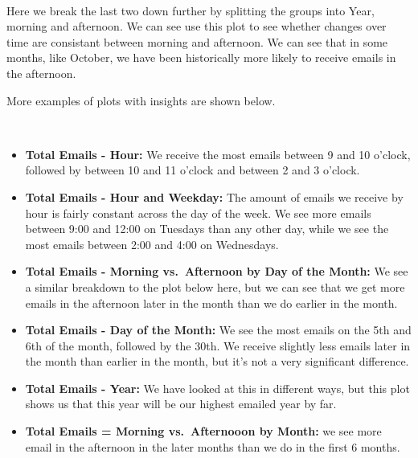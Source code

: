 \documentclass[11pt]{article}
\providecommand{\tightlist}{%
      \setlength{\itemsep}{0pt}\setlength{\parskip}{0pt}}
\begin{document}
    \begin{center}
    \end{center}
    { \hspace*{\fill} \\}
    
    Here we break the last two down further by splitting the groups into
Year, morning and afternoon. We can see use this plot to see whether
changes over time are consistant between morning and afternoon. We can
see that in some months, like October, we have been historically more
likely to receive emails in the afternoon.

    More examples of plots with insights are shown below.

    \begin{center}
    \end{center}
    { \hspace*{\fill} \\}
    
    \begin{itemize}
\tightlist
\item
  \textbf{Total Emails - Hour:} We receive the most emails between 9 and
  10 o'clock, followed by between 10 and 11 o'clock and between 2 and 3
  o'clock.
\item
  \textbf{Total Emails - Hour and Weekday:} The amount of emails we
  receive by hour is fairly constant across the day of the week. We see
  more emails between 9:00 and 12:00 on Tuesdays than any other day,
  while we see the most emails between 2:00 and 4:00 on Wednesdays.
\item
  \textbf{Total Emails - Morning vs.~Afternoon by Day of the Month:} We
  see a similar breakdown to the plot below here, but we can see that we
  get more emails in the afternoon later in the month than we do earlier
  in the month.
\item
  \textbf{Total Emails - Day of the Month:} We see the most emails on
  the 5th and 6th of the month, followed by the 30th. We receive
  slightly less emails later in the month than earlier in the month, but
  it's not a very significant difference.
\item
  \textbf{Total Emails - Year:} We have looked at this in different
  ways, but this plot shows us that this year will be our highest
  emailed year by far.
\item
  \textbf{Total Emails = Morning vs.~Afternooon by Month:} we see more
  email in the afternoon in the later months than we do in the first 6
  months.
\end{itemize}
\end{document}
